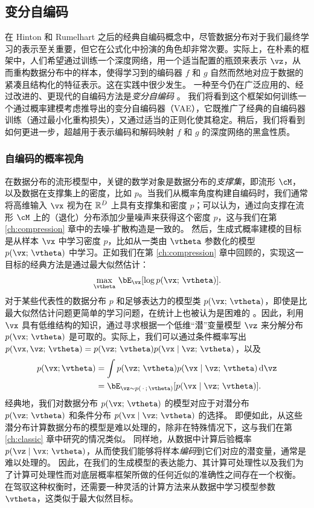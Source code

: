 \documentclass[../../book-main.tex]{subfiles}
\begin{document}
\subsection{变分自编码}

在 Hinton 和 Rumelhart \cite{Rumelhart1986} 之后的经典自编码概念中，尽管数据分布对于我们最终学习的表示至关重要，但它在公式化中扮演的角色却非常次要。实际上，在朴素的框架中，人们希望通过训练一个深度网络，用一个适当配置的瓶颈来表示 $\vz$，从而重构数据分布中的样本，使得学习到的编码器 $f$ 和 $g$ 自然而然地对应于数据的紧凑且结构化的特征表示。这在实践中很少发生。
一种至今仍在广泛应用的、经过改进的、更现代的自编码方法是\textit{变分自编码} \cite{Kingma2013-sb,Kingma2019-zh}。
我们将看到这个框架如何训练一个通过概率建模考虑推导出的变分自编码器（VAE），它既推广了经典的自编码器训练（通过最小化重构损失），又通过适当的正则化使其稳定。稍后，我们将看到如何更进一步，超越用于表示编码和解码映射 $f$ 和 $g$ 的深度网络的黑盒性质。

\subsubsection{自编码的概率视角}
在数据分布的流形模型中，关键的数学对象是数据分布的\textit{支撑集}，即流形 $\cM$，以及数据在支撑集上的密度，比如 $p$。当我们从概率角度构建自编码时，我们通常将高维输入 $\vx$ 视为在 $\mathbb{R}^D$ 上具有支撑集和密度 $p$；可以认为，通过向支撑在流形 $\cM$ 上的（退化）分布添加少量噪声来获得这个密度 $p$，这与我们在第 \ref{ch:compression} 章中的去噪-扩散构造是一致的。
然后，生成式概率建模的目标是从样本 $\vx$ 中学习密度 $p$，比如从一类由 $\vtheta$ 参数化的模型 $p(\vx;\, \vtheta)$ 中学习。正如我们在第 \ref{ch:compression} 章中回顾的，实现这一目标的经典方法是通过最大似然估计：
\begin{equation*}\label{eq:VAE-MLE}
\max_{\vtheta}\, \bE_{\vx}[ \log p(\vx;\, \vtheta) ].
\end{equation*}
对于某些代表性的数据分布 $p$ %
和足够表达力的模型类 $p(\vx;\, \vtheta)$，即使是比最大似然估计问题更简单的学习问题，在统计上也被认为是困难的 \cite{Yang1999-wb}。因此，利用 $\vx$ 具有低维结构的知识，通过寻求根据一个低维“潜”变量模型 $\vz$ 来分解分布 $p(\vx ;\, \vtheta)$ 是可取的。实际上，我们可以通过条件概率写出 $p(\vx, \vz ;\, \vtheta)
= p(\vz;\, \vtheta) p(\vx \mid \vz;\, \vtheta)$，以及
\begin{align*}
p(\vx; \vtheta) &= \int p(\vz;\, \vtheta) p(\vx \mid \vz;\, \vtheta) \odif \vz
\\
&=
\bE_{\vz \sim p(\,\cdot\,;\, \vtheta)}[ p(\vx \mid \vz;\, \vtheta) ].
\end{align*}
经典地，我们对数据分布 $p(\vx;\, \vtheta)$ 的模型对应于对潜分布 $p(\vz;\, \vtheta)$ 和条件分布 $p(\vx \mid \vz;\, \vtheta)$ 的选择。
即便如此，从这些潜分布计算数据分布的模型是难以处理的，除非在特殊情况下，这与我们在第 \ref{ch:classic} 章中研究的情况类似。
同样地，从数据中计算后验概率 $p(\vz \mid \vx;\, \vtheta)$，从而使我们能够将样本\textit{编码}到它们对应的潜变量，通常是难以处理的。
因此，在我们的生成模型的表达能力、其计算可处理性以及我们为了计算可处理性而对底层概率框架所做的任何近似的准确性之间存在一个权衡。
在驾驭这种权衡时，还需要一种灵活的计算方法来从数据中学习模型参数 $\vtheta$，这类似于最大似然目标。
\end{document}
